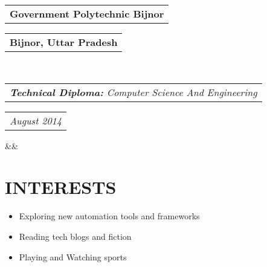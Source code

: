 \documentclass[11pt,a4paper,roman]{moderncv}
\makeatletter
\newcommand*{\customcventry}[7][.25em]{
  \begin{tabular}{@{}l} 
    {\bfseries #4}
  \end{tabular}
  \hfill
  \begin{tabular}{l@{}}
     {\bfseries #5}
  \end{tabular} \\
  \begin{tabular}{@{}l} 
    {\itshape #3}
  \end{tabular}
  \hfill
  \begin{tabular}{l@{}}
     {\itshape #2}
  \end{tabular}
  \ifx&#7&%
  \else{\\%
    \begin{minipage}{\maincolumnwidth}%
      \small#7%
    \end{minipage}}\fi%
  \par\addvspace{#1}}
\makeatother
\begin{document}
{\customcventry{August 2014}{\textbf {Technical Diploma:} Computer Science And Engineering}{Government Polytechnic Bijnor}{Bijnor, Uttar Pradesh}{}{}}
\vspace{-2mm}

\section{INTERESTS}
\vspace{-2mm}
\begin{itemize}
  \item Exploring new automation tools and frameworks
  \item Reading tech blogs and fiction
  \item Playing and Watching sports
\end{itemize}
\end{document}
